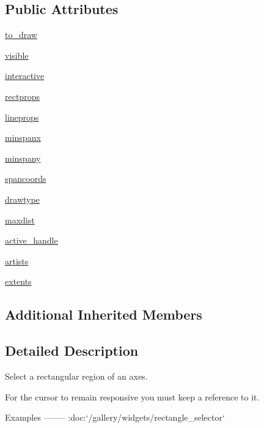 \subsection*{Public Attributes}
\begin{DoxyCompactItemize}
\item 
\hyperlink{classmatplotlib_1_1widgets_1_1RectangleSelector_a5d86311add5bdd84f63c7dc6a01a9fc2}{to\+\_\+draw}
\item 
\hyperlink{classmatplotlib_1_1widgets_1_1RectangleSelector_a2aa5c8fe42afa956f258be088ab238ab}{visible}
\item 
\hyperlink{classmatplotlib_1_1widgets_1_1RectangleSelector_ab980b6a7e434ea027d7e981539ac345d}{interactive}
\item 
\hyperlink{classmatplotlib_1_1widgets_1_1RectangleSelector_aebc448d5d14726f0b9f971b33d6d4884}{rectprops}
\item 
\hyperlink{classmatplotlib_1_1widgets_1_1RectangleSelector_a59f14aaa8496bcc05a0c8ec0426cd892}{lineprops}
\item 
\hyperlink{classmatplotlib_1_1widgets_1_1RectangleSelector_aa6d7b9426a8a97b346c54f7c75bfa5f0}{minspanx}
\item 
\hyperlink{classmatplotlib_1_1widgets_1_1RectangleSelector_a9c159489f1d66c41b6321de9d44c58d3}{minspany}
\item 
\hyperlink{classmatplotlib_1_1widgets_1_1RectangleSelector_a43cc351b3b8d26c57c70805867004bff}{spancoords}
\item 
\hyperlink{classmatplotlib_1_1widgets_1_1RectangleSelector_aea33252f7eebfc3d4ac3e5450e5cad75}{drawtype}
\item 
\hyperlink{classmatplotlib_1_1widgets_1_1RectangleSelector_ae49d9b1d3c8220db0f5a90c23ecb4e43}{maxdist}
\item 
\hyperlink{classmatplotlib_1_1widgets_1_1RectangleSelector_a734ff1a5fa44c09a15594bac88c9713b}{active\+\_\+handle}
\item 
\hyperlink{classmatplotlib_1_1widgets_1_1RectangleSelector_a463b122ed963642fed40cca140efbcfc}{artists}
\item 
\hyperlink{classmatplotlib_1_1widgets_1_1RectangleSelector_a9ce3b014e6e5ba477b57eeedd6a24e3f}{extents}
\end{DoxyCompactItemize}
\subsection*{Additional Inherited Members}


\subsection{Detailed Description}
\begin{DoxyVerb}Select a rectangular region of an axes.

For the cursor to remain responsive you must keep a reference to it.

Examples
--------
:doc:`/gallery/widgets/rectangle_selector`
\end{DoxyVerb}
 

